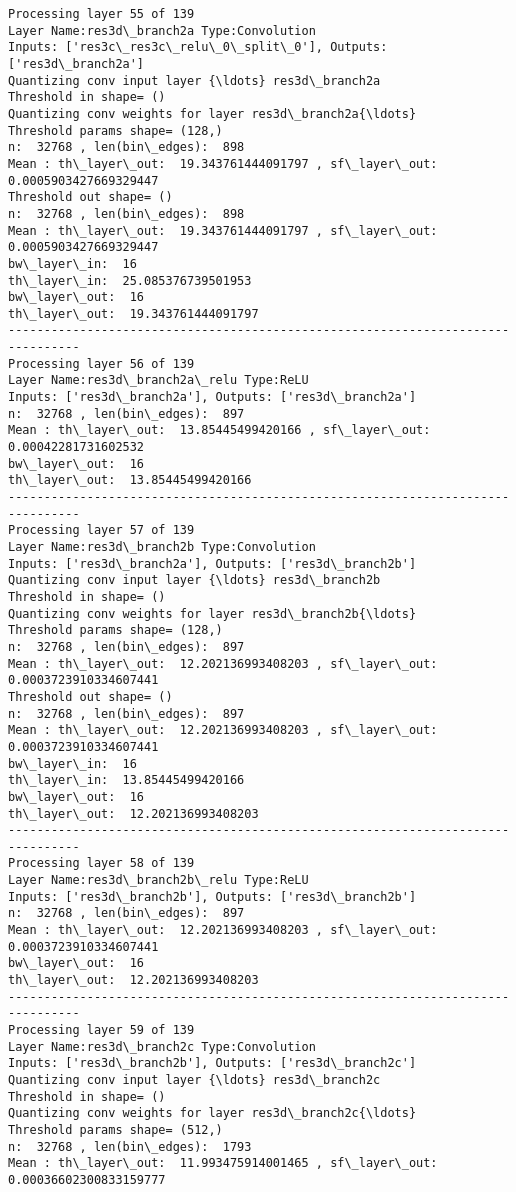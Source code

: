 \documentclass[11pt]{article}
\begin{document}
\begin{Verbatim}[commandchars=\\\{\}]
Processing layer 55 of 139
Layer Name:res3d\_branch2a Type:Convolution
Inputs: ['res3c\_res3c\_relu\_0\_split\_0'], Outputs: ['res3d\_branch2a']
Quantizing conv input layer {\ldots} res3d\_branch2a
Threshold in shape= ()
Quantizing conv weights for layer res3d\_branch2a{\ldots}
Threshold params shape= (128,)
n:  32768 , len(bin\_edges):  898
Mean : th\_layer\_out:  19.343761444091797 , sf\_layer\_out:  0.0005903427669329447
Threshold out shape= ()
n:  32768 , len(bin\_edges):  898
Mean : th\_layer\_out:  19.343761444091797 , sf\_layer\_out:  0.0005903427669329447
bw\_layer\_in:  16
th\_layer\_in:  25.085376739501953
bw\_layer\_out:  16
th\_layer\_out:  19.343761444091797
--------------------------------------------------------------------------------
Processing layer 56 of 139
Layer Name:res3d\_branch2a\_relu Type:ReLU
Inputs: ['res3d\_branch2a'], Outputs: ['res3d\_branch2a']
n:  32768 , len(bin\_edges):  897
Mean : th\_layer\_out:  13.85445499420166 , sf\_layer\_out:  0.00042281731602532
bw\_layer\_out:  16
th\_layer\_out:  13.85445499420166
--------------------------------------------------------------------------------
Processing layer 57 of 139
Layer Name:res3d\_branch2b Type:Convolution
Inputs: ['res3d\_branch2a'], Outputs: ['res3d\_branch2b']
Quantizing conv input layer {\ldots} res3d\_branch2b
Threshold in shape= ()
Quantizing conv weights for layer res3d\_branch2b{\ldots}
Threshold params shape= (128,)
n:  32768 , len(bin\_edges):  897
Mean : th\_layer\_out:  12.202136993408203 , sf\_layer\_out:  0.0003723910334607441
Threshold out shape= ()
n:  32768 , len(bin\_edges):  897
Mean : th\_layer\_out:  12.202136993408203 , sf\_layer\_out:  0.0003723910334607441
bw\_layer\_in:  16
th\_layer\_in:  13.85445499420166
bw\_layer\_out:  16
th\_layer\_out:  12.202136993408203
--------------------------------------------------------------------------------
Processing layer 58 of 139
Layer Name:res3d\_branch2b\_relu Type:ReLU
Inputs: ['res3d\_branch2b'], Outputs: ['res3d\_branch2b']
n:  32768 , len(bin\_edges):  897
Mean : th\_layer\_out:  12.202136993408203 , sf\_layer\_out:  0.0003723910334607441
bw\_layer\_out:  16
th\_layer\_out:  12.202136993408203
--------------------------------------------------------------------------------
Processing layer 59 of 139
Layer Name:res3d\_branch2c Type:Convolution
Inputs: ['res3d\_branch2b'], Outputs: ['res3d\_branch2c']
Quantizing conv input layer {\ldots} res3d\_branch2c
Threshold in shape= ()
Quantizing conv weights for layer res3d\_branch2c{\ldots}
Threshold params shape= (512,)
n:  32768 , len(bin\_edges):  1793
Mean : th\_layer\_out:  11.993475914001465 , sf\_layer\_out:  0.00036602300833159777

\end{Verbatim}
\end{document}
